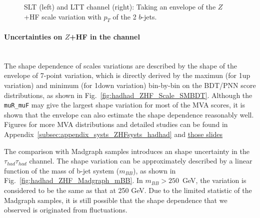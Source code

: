 \begin{figure}[!h]
\centering
{}\quad
{}\quad
\caption{SLT (left) and LTT channel (right): Taking an envelope of the $Z$+HF scale variation with $p_T$ of the 2 $b$-jets.}
\label{fig:lephad_ZHF_scale_pTBB}
\end{figure}


\paragraph{Uncertainties on $Z$+HF in the \hadhad channel}\mbox{}\\

The shape dependence of scales variations are described by the shape of the envelope of 7-point variation, which is directly derived by the maximun (for 1up variation) and minimum (for 1down variation) bin-by-bin on the BDT/PNN score distributions, as shown in Fig.~\ref{fig:hadhad_ZHF_Scale_SMBDT}. Although the \texttt{muR\_muF} may give the largest shape variation for most of the MVA scores, it is shown that the envelope can also estimate the shape dependence reasonably well. Figures for more MVA distributions and detailed studies can be found in Appendix~\ref{subsec:appendix_systs_ZHFsysts_hadhad} and \href{https://indico.cern.ch/event/1042450/contributions/4422123/attachments/2269878/3854717/Z%2Bjets%20modelling%20v3.pdf}{\underline{those slides}}

The comparison with Madgraph samples introduces an shape uncertainty in the $\tau_{had}\tau_{had}$ channel. 
The shape variation can be approximately described by a linear function of the mass of b-jet system ($m_{BB}$), as shown in Fig.~\ref{fig:hadhad_ZHF_Madgraph_mBB}. In $m_{BB}>250$~GeV, the variation is considered to be the same as that at 250 GeV.
Due to the limited statistic of the Madgraph samples, it is still possible that the shape dependence that we observed is originated from fluctuations. 

